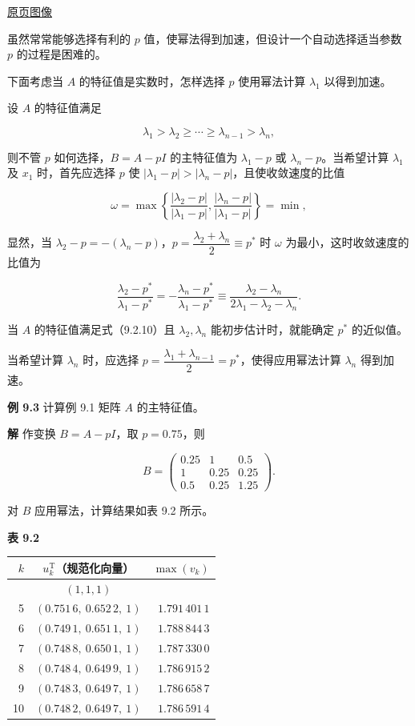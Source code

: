 \documentclass[
  10pt,
  fontset=fandol]{ctexart}
\newcounter{none} %
\begin{document}
\href{../../source-images/pdf-239.jpeg}{原页图像}

虽然常常能够选择有利的 \(p\) 值，使幂法得到加速，但设计一个自动选择适当参数 \(p\) 的过程是困难的。

下面考虑当 \(A\) 的特征值是实数时，怎样选择 \(p\) 使用幂法计算 \(\lambda_1\) 以得到加速。

设 \(A\) 的特征值满足

\[
\lambda_1>\lambda_2\geq\cdots\geq\lambda_{n-1}>\lambda_n,
\tag{9.2.10}
\]

则不管 \(p\) 如何选择，\(B=A-pI\) 的主特征值为 \(\lambda_1-p\) 或 \(\lambda_n-p\)。当希望计算 \(\lambda_1\) 及 \(x_1\) 时，首先应选择 \(p\) 使 \(|\lambda_1-p|>|\lambda_n-p|\)，且使收敛速度的比值

\[
\omega=\max\left\{\frac{|\lambda_2-p|}{|\lambda_1-p|},\frac{|\lambda_n-p|}{|\lambda_1-p|}\right\}=\min,
\]

显然，当 \(\lambda_2-p=-(\lambda_n-p)\)，\(p=\dfrac{\lambda_2+\lambda_n}{2}\equiv p^*\) 时 \(\omega\) 为最小，这时收敛速度的比值为

\[
\frac{\lambda_2-p^*}{\lambda_1-p^*}=-\frac{\lambda_n-p^*}{\lambda_1-p^*}\equiv\frac{\lambda_2-\lambda_n}{2\lambda_1-\lambda_2-\lambda_n}.
\]

当 \(A\) 的特征值满足式（9.2.10）且 \(\lambda_2,\lambda_n\) 能初步估计时，就能确定 \(p^*\) 的近似值。

当希望计算 \(\lambda_n\) 时，应选择 \(p=\dfrac{\lambda_1+\lambda_{n-1}}{2}=p^*\)，使得应用幂法计算 \(\lambda_n\) 得到加速。

\textbf{例 9.3} 计算例 9.1 矩阵 \(A\) 的主特征值。

\textbf{解} 作变换 \(B=A-pI\)，取 \(p=0.75\)，则

\[
B=\begin{pmatrix}
0.25&1&0.5\\
1&0.25&0.25\\
0.5&0.25&1.25
\end{pmatrix}.
\]

对 \(B\) 应用幂法，计算结果如表 9.2 所示。

\textbf{表 9.2}

{\def\LTcaptype{none} %
\begin{longtable}[]{@{}rcr@{}}
\toprule\noalign{}
\(k\) & \(u_k^{\mathrm T}\)（规范化向量） & \(\max(v_k)\) \\
\midrule\noalign{}
\endhead
\bottomrule\noalign{}
\endlastfoot
0 & \((1,1,1)\) & \\
5 & \((0.751\,6,\ 0.652\,2,\ 1)\) & \(1.791\,401\,1\) \\
6 & \((0.749\,1,\ 0.651\,1,\ 1)\) & \(1.788\,844\,3\) \\
7 & \((0.748\,8,\ 0.650\,1,\ 1)\) & \(1.787\,330\,0\) \\
8 & \((0.748\,4,\ 0.649\,9,\ 1)\) & \(1.786\,915\,2\) \\
9 & \((0.748\,3,\ 0.649\,7,\ 1)\) & \(1.786\,658\,7\) \\
10 & \((0.748\,2,\ 0.649\,7,\ 1)\) & \(1.786\,591\,4\) \\
\end{longtable}
}
\end{document}
